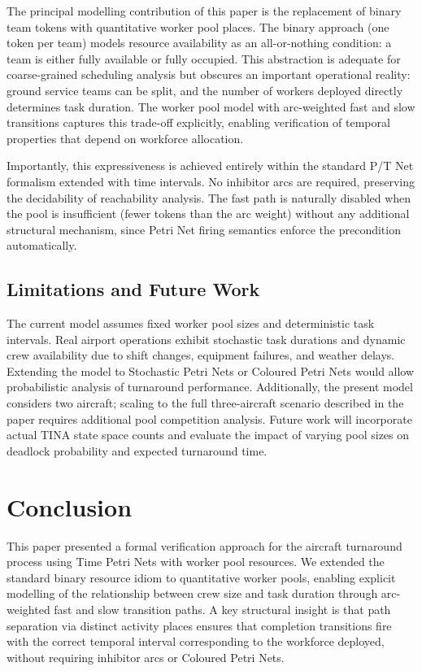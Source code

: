 \documentclass[conference]{IEEEtran}
\begin{document}
The principal modelling contribution of this paper is the replacement of binary
team tokens with quantitative worker pool places. The binary approach (one token
per team) models resource availability as an all-or-nothing condition: a team is
either fully available or fully occupied. This abstraction is adequate for
coarse-grained scheduling analysis but obscures an important operational reality:
ground service teams can be split, and the number of workers deployed directly
determines task duration. The worker pool model with arc-weighted fast and slow
transitions captures this trade-off explicitly, enabling verification of temporal
properties that depend on workforce allocation.

Importantly, this expressiveness is achieved entirely within the standard P/T
Net formalism extended with time intervals. No inhibitor arcs are required,
preserving the decidability of reachability analysis. The fast path is naturally
disabled when the pool is insufficient (fewer tokens than the arc weight) without
any additional structural mechanism, since Petri Net firing semantics enforce the
precondition automatically.

\subsection{Limitations and Future Work}

The current model assumes fixed worker pool sizes and deterministic task
intervals. Real airport operations exhibit stochastic task durations and dynamic
crew availability due to shift changes, equipment failures, and weather delays.
Extending the model to Stochastic Petri Nets or Coloured Petri Nets would allow
probabilistic analysis of turnaround performance. Additionally, the present model
considers two aircraft; scaling to the full three-aircraft scenario described in
the paper requires additional pool competition analysis. Future work will
incorporate actual TINA state space counts and evaluate the impact of varying
pool sizes on deadlock probability and expected turnaround time.


\section{Conclusion}

This paper presented a formal verification approach for the aircraft turnaround
process using Time Petri Nets with worker pool resources. We extended the
standard binary resource idiom to quantitative worker pools, enabling explicit
modelling of the relationship between crew size and task duration through
arc-weighted fast and slow transition paths. A key structural insight is that
path separation via distinct activity places ensures that completion transitions
fire with the correct temporal interval corresponding to the workforce deployed,
without requiring inhibitor arcs or Coloured Petri Nets.
\end{document}

